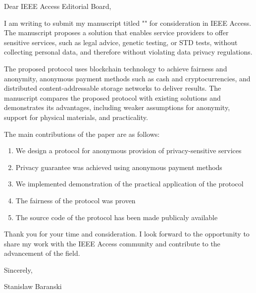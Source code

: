 \documentclass[preprint,3p]{elsarticle}
\begin{document}
Dear IEEE Access Editorial Board,

I am writing to submit my manuscript titled "\TITLE" for consideration in IEEE Access. The manuscript proposes a solution that enables service providers to offer sensitive services, such as legal advice, genetic testing, or STD tests, without collecting personal data, and therefore without violating data privacy regulations. 

The proposed protocol uses blockchain technology to achieve fairness and anonymity, anonymous payment methods such as cash and cryptocurrencies, and distributed content-addressable storage networks to deliver results. The manuscript compares the proposed protocol with existing solutions and demonstrates its advantages, including weaker assumptions for anonymity, support for physical materials, and practicality.

The main contributions of the paper are as follows:
\begin{enumerate}
    \item We design a protocol for anonymous provision of privacy-sensitive services
    \item Privacy guarantee was achieved using anonymous payment methods
    \item We implemented demonstration of the practical application of the protocol
    \item The fairness of the protocol was proven
    \item The source code of the protocol has been made publicaly available
\end{enumerate}

Thank you for your time and consideration. I look forward to the opportunity to share my work with the IEEE Access community and contribute to the advancement of the field.



\noindent Sincerely,

\noindent Stanislaw Baranski
\end{document}
